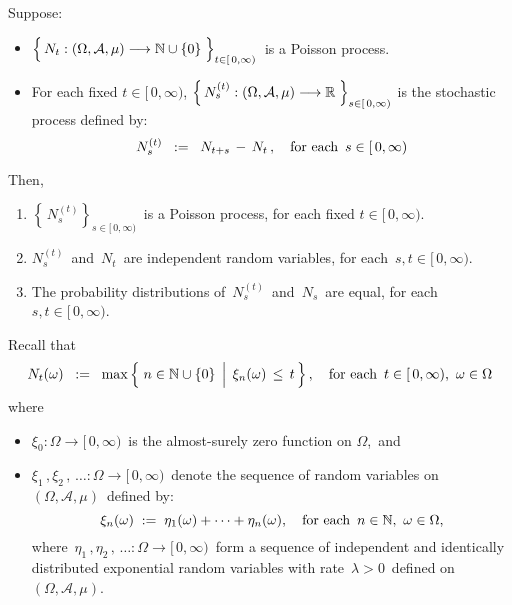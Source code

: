\vskip 0.5cm
\begin{theorem}
\mbox{}
\vskip 0.15cm
\noindent
Suppose:
\begin{itemize}
\item
	$\left\{\,N_{t} : (\Omega,\mathcal{A},\mu) \overset{{\color{white}-}}{\longrightarrow} \N\cup\{0\} \;\right\}_{t \in [\,0,\infty)}$\,
	is a Poisson process.
\item
	For each fixed $t \in [\,0,\infty)$,
	$\left\{\,N^{(t)}_{s} : (\Omega,\mathcal{A},\mu) \overset{{\color{white}-}}{\longrightarrow} \Re \;\right\}_{s \in [\,0,\infty)}$\;
	is the stochastic process defined by:
	\begin{equation*}
	N^{(t)}_{s} \;\; := \;\; N_{t+s} \,-\, N_{t}\,,
	\quad
	\textnormal{for each \,$s \in [\,0,\infty)$}
	\end{equation*}
\end{itemize}
Then,
\begin{enumerate}
\item
	$\left\{\,N^{(t)}_{s}\right\}_{s \in [\,0,\infty)}$\, is a Poisson process, for each fixed $t \in [\,0,\infty)$.
\item
	$N^{(t)}_{s}$\, and \,$N_{t}$\, are independent random variables, for each \,$s, t \in [\,0,\infty)$.
\item
	The probability distributions of \,$N^{(t)}_{s}$\, and \,$N_{s}$\, are equal, for each \,$s, t \in [\,0,\infty)$.
\end{enumerate}
\end{theorem}
\proof
Recall that
\begin{equation*}
N_{t}(\omega)
\;\; := \;\;
	\max\left\{\,\left.
		n \overset{{\color{white}.}}{\in} \N\cup\{0\}
		\,\;\right\vert\;
		\xi_{n}(\omega) \,\leq\, t
		\,\right\},
\quad
\textnormal{for each \,$t \in [\,0,\infty)$,\, $\omega \in \Omega$}
\end{equation*}
where
\begin{itemize}
\item
	$\xi_{0} : \Omega \longrightarrow [\,0,\infty)$\, is the almost-surely zero function on $\Omega$,\,
and
\item
	$\xi_{1}\,, \xi_{2}\,, \,\ldots : \Omega \longrightarrow [\,0,\infty)$\,
	denote the sequence of random variables on
	\,$(\Omega,\mathcal{A},\mu)$\, defined by:
	\begin{equation*}
	\xi_{n}(\omega) \; := \; \eta_{1}(\omega) + \cdots + \eta_{n}(\omega),
	\quad
	\textnormal{for each \,$n \in \mathbb{N}$,\, $\omega \in \Omega$},
	\end{equation*}
	where
	\,$\eta_{1}\,, \eta_{2}\,, \,\ldots : \Omega \longrightarrow [\,0,\infty)$\,
	form a sequence of independent and identically distributed
	exponential random variables with rate \,$\lambda > 0$\,
	defined on \,$(\Omega,\mathcal{A},\mu)$.
\end{itemize}
